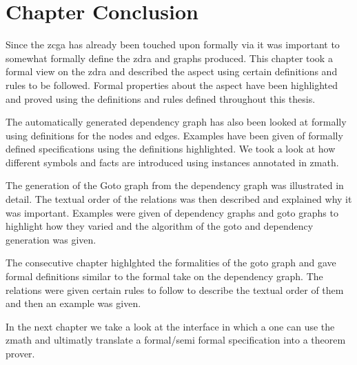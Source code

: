 \section{Chapter Conclusion}

Since the \gls{zcga} has already been touched upon formally via \cite{wtt} it
was important to somewhat formally define the \gls{zdra} and graphs produced.
This chapter took a formal view on the \gls{zdra} and described the aspect using
certain definitions and rules to be followed. Formal properties about the aspect
have been highlighted and proved using the definitions and rules defined
throughout this thesis. 

The automatically generated dependency graph has also been looked at formally
using definitions for the nodes and edges. Examples have been given of formally
defined specifications using the definitions highlighted. We took a look at how
different symbols and facts are introduced using instances annotated in
\gls{zmath}.

The generation of the Goto graph from the dependency graph was illustrated in
detail. The textual order of the relations was then described and explained why
it was important. Examples were given of dependency graphs and goto graphs to
highlight how they varied and the algorithm of the goto and dependency
generation was given.

The consecutive chapter highlghted the formalities of the goto graph and gave
formal definitions similar to the formal take on the dependency graph. The
relations were given certain rules to follow to describe the textual order of
them and then an example was given. 

In the next chapter we take a look at the interface in which a one can use the
\gls{zmath} and ultimatly translate a formal/semi formal specification into a
theorem prover.


